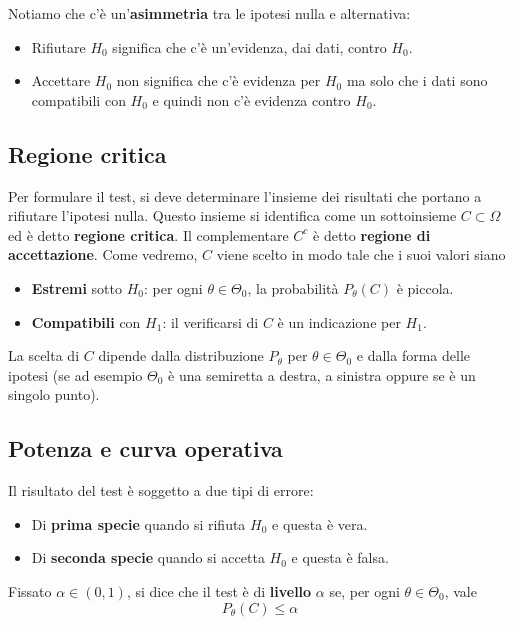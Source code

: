 \begin{observation}
	Notiamo che c'è un'\textbf{asimmetria} tra le ipotesi nulla e alternativa:
	\begin{itemize}
		\item Rifiutare $H_0$ significa che c'è un'evidenza, dai dati, contro $H_0$.
		\item Accettare $H_0$ non significa che c'è evidenza per $H_0$ ma solo che i dati sono
		      compatibili con $H_0$ e quindi non c'è evidenza contro $H_0$.
	\end{itemize}
\end{observation}

\subsection{Regione critica}
Per formulare il test, si deve determinare l'insieme dei risultati che portano a rifiutare
l'ipotesi nulla. Questo insieme si identifica come un sottoinsieme $C \subset \Omega$ ed è
detto \textbf{regione critica}. Il complementare $C^c$ è detto \textbf{regione di accettazione}.
Come vedremo, $C$ viene scelto in modo tale che i suoi valori siano
\begin{itemize}
	\item \textbf{Estremi} sotto $H_0$: per ogni $\theta \in \Theta_0$, la probabilità
	      $P_\theta (C)$ è piccola.
	\item \textbf{Compatibili} con $H_1$: il verificarsi di $C$ è un indicazione per $H_1$.
\end{itemize}
La scelta di $C$ dipende dalla distribuzione $P_\theta$ per $\theta \in \Theta_0$ e dalla forma
delle ipotesi (se ad esempio $\Theta_0$ è una semiretta a destra, a sinistra oppure se è un singolo
punto).

\subsection{Potenza e curva operativa}
Il risultato del test è soggetto a due tipi di errore:
\begin{itemize}
	\item Di \textbf{prima specie} quando si rifiuta $H_0$ e questa è vera.
	\item Di \textbf{seconda specie} quando si accetta $H_0$ e questa è falsa.
\end{itemize}

\begin{definition}
	Fissato $\alpha \in (0,1)$, si dice che il test è di \textbf{livello} $\alpha$ se, per ogni
	$\theta \in \Theta_0$, vale
	\[ P_\theta (C) \leq \alpha \]
\end{definition}

